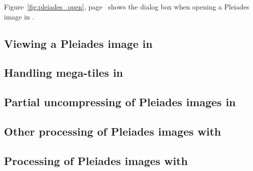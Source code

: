 Figure~\ref{fig:pleiades_open}, page~\pageref{fig:pleiades_open} shows
the dialog box when opening a Pleiades image in \mont.

\subsection{Viewing a Pleiades image in \mont}

\subsection{Handling mega-tiles in \mont}

\subsection{Partial uncompressing of Pleiades images in \mont}

\subsection{Other processing of Pleiades images with \mont}

\subsection{Processing of Pleiades images with \app}
